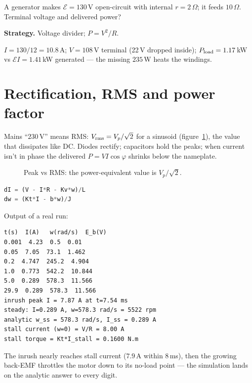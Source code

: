 \begin{example}\label{ex:gensag}
A generator makes $\mathcal E=130$\,V open-circuit with internal
$r=2\,\Omega$; it feeds $10\,\Omega$. Terminal voltage and delivered
power?
\par\smallskip
\textbf{Strategy.} Voltage divider; $P=V^{2}/R$.
\begin{solution}
$I=130/12=10.8$\,A; $V=108$\,V terminal (22\,V dropped inside);
$P_{\rm load}=1.17$\,kW vs $\mathcal EI=1.41$\,kW generated ---
the missing $235$\,W heats the windings. \checkmark
\end{solution}
\end{example}

\section{Rectification, RMS and power factor}\label{sec:pw-rms}

Mains ``$230$\,V'' means RMS: $V_{\rm rms}=V_p/\sqrt2$ for a sinusoid
(figure~\ref{fig:rms}), the value that dissipates like DC. Diodes
rectify; capacitors hold the peaks; when current isn't in phase the
delivered $P=VI\cos\varphi$ shrinks below the nameplate.

\begin{figure}[htbp]\centering

\caption{Peak vs RMS: the power-equivalent value is $V_p/\sqrt2$.}
\label{fig:rms}
\end{figure}

\begin{lstlisting}[language=Python,caption={\texttt{code/ch18\_motor\_start.py} --- motor ODE: $V=IR+L\,\dot I+K_v\omega$, $J\dot\omega=K_tI-b\omega$.},label={lst:motor}]
dI = (V - I*R - Kv*w)/L
dw = (Kt*I - b*w)/J
\end{lstlisting}

Output of a real run:
\begin{lstlisting}[numbers=none]
t(s)  I(A)   w(rad/s)  E_b(V)
0.001  4.23  0.5  0.01
0.05  7.05  73.1  1.462
0.2  4.747  245.2  4.904
1.0  0.773  542.2  10.844
5.0  0.289  578.3  11.566
29.9  0.289  578.3  11.566
inrush peak I = 7.87 A at t=7.54 ms
steady: I=0.289 A, w=578.3 rad/s = 5522 rpm
analytic w_ss = 578.3 rad/s, I_ss = 0.289 A
stall current (w=0) = V/R = 8.00 A
stall torque = Kt*I_stall = 0.1600 N.m
\end{lstlisting}

The inrush nearly reaches stall current ($7.9$\,A within $8$\,ms),
then the growing back-EMF throttles the motor down to its no-load
point --- the simulation lands on the analytic answer to every digit.

